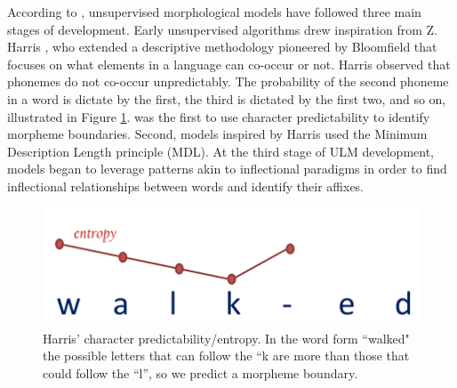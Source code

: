 \documentclass[12pt]{article}
\begin{document}
According to , unsupervised morphological models have followed three main stages of development. Early unsupervised algorithms drew inspiration from Z. Harris \cite{harris_phoneme_1955,harris_morpheme_1967}, who extended a descriptive methodology pioneered by Bloomfield that focuses on what elements in a language can co-occur or not. Harris observed that phonemes do not co-occur unpredictably. The probability of the second phoneme in a word is dictate by the first, the third is dictated by the first two, and so on, illustrated in Figure \ref{fig:harris}.  was the first to use character predictability to identify morpheme boundaries. Second, models inspired by Harris used the Minimum Description Length principle (MDL). At the third stage of ULM development, models began to leverage patterns akin to inflectional paradigms in order to find inflectional relationships between words and identify their affixes.

\begin{figure}[ht]
\label{fig:harris}
\begin{center}
\includegraphics[width=0.5\columnwidth]{Harris-Entropy-image.PNG}
\caption{Harris' character predictability/entropy. In the word form ``walked" the possible letters that can follow the ``k are more than those that could follow the ``l'', so we predict a morpheme boundary.}
\end{center}
\end{figure}
\end{document}
